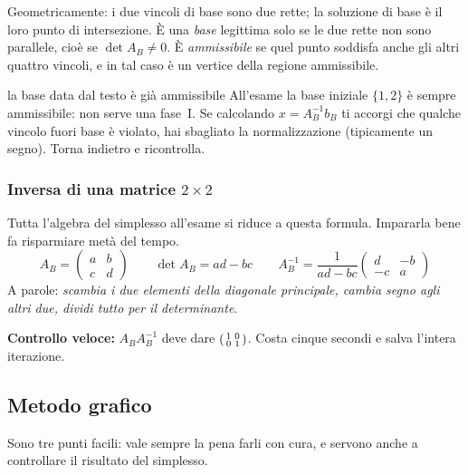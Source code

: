 \documentclass[11pt,a4paper]{article}
\begin{document}
Geometricamente: i due vincoli di base sono due rette; la soluzione di base è il loro
punto di intersezione. È una \emph{base} legittima solo se le due rette non sono parallele,
cioè se $\det A_B \ne 0$. È \emph{ammissibile} se quel punto soddisfa anche gli altri quattro
vincoli, e in tal caso è un vertice della regione ammissibile.

\begin{att}{la base data dal testo è già ammissibile}
All'esame la base iniziale $\{1,2\}$ è sempre ammissibile: non serve una fase~I.
Se calcolando $x = A_B^{-1}b_B$ ti accorgi che qualche vincolo fuori base è violato,
hai sbagliato la normalizzazione (tipicamente un segno). Torna indietro e ricontrolla.
\end{att}

\subsubsection{Inversa di una matrice $2\times 2$}
\label{sec:inversa}

Tutta l'algebra del simplesso all'esame si riduce a questa formula. Impararla bene fa
risparmiare metà del tempo.
\[
A_B = \begin{pmatrix} a & b\\ c & d\end{pmatrix}
\qquad
\det A_B = ad - bc
\qquad
A_B^{-1} = \frac{1}{ad-bc}\begin{pmatrix} d & -b\\ -c & a\end{pmatrix}
\]
A parole: \emph{scambia i due elementi della diagonale principale, cambia segno agli altri due,
dividi tutto per il determinante}.

\textbf{Controllo veloce:} $A_B A_B^{-1}$ deve dare $\begin{psmallmatrix}1&0\\0&1\end{psmallmatrix}$.
Costa cinque secondi e salva l'intera iterazione.

\subsection{Metodo grafico}

Sono tre punti facili: vale sempre la pena farli con cura, e servono anche a controllare
il risultato del simplesso.
\end{document}
